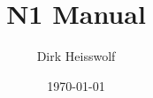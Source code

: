 \documentclass[a4paper,
               titlepage]{article}
\begin{document}
\makeatletter
\newcommand*{\textoverline}[1]{$\overline{\hbox{#1}}\m@th$}
\makeatother

\makeatletter
\renewcommand{\thetable}{\thesection-\@arabic\c@table}
\makeatother

\makeatletter
\renewcommand{\thefigure}{\thesection-\@arabic\c@figure}
\makeatother

\newcommand{\secref}[2][Section]{\hyperref[{#2}]{\mbox{#1~\ref*{#2}} \mbox{``\nameref*{#2}``}}}
\newcommand{\tabref}[2][Table]{\hyperref[{#2}]{\mbox{#1~\ref*{#2}}}}
\newcommand{\figref}[2][Figure]{\hyperref[{#2}]{\mbox{#1~\ref*{#2}}}}

\title{N1 Manual}
\date{\today}
\author{Dirk Heisswolf}
\maketitle



\setcounter{tocdepth}{2}
\tableofcontents
\pagebreak
\listoffigures
\pagebreak
\listoftables





%

%

%

%

%



\end{document}
